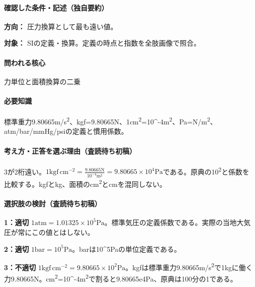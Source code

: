 \paragraph{確認した条件・記述（独自要約）}\mbox{}\par

\noindent\textbf{方向：} 圧力換算として最も遠い値。\par

\noindent\textbf{対象：} SIの定義・換算。定義の時点と指数を全肢画像で照合。\par

\paragraph{問われる核心} 力単位と面積換算の二乗

\paragraph{必要知識} 標準重力9.80665m/s\textsuperscript{2}、kgf=\allowbreak{}9.80665N、1cm\textsuperscript{2}=10\textasciicircum{}-4m\textsuperscript{2}、Pa=\allowbreak{}N/m\textsuperscript{2}、atm/bar/mmHg/psiの定義と慣用係数。

\paragraph{考え方・正答を選ぶ理由（査読待ち初稿）} 3が2桁遠い。\(1\mathrm{kgf\,cm^{-2}}=\frac{9.80665\mathrm N}{10^{-4}\mathrm{m^2}}=9.80665\times10^4\mathrm{Pa}\)である。原典の10\textsuperscript{2}と係数を比較する。kgfとkg、面積のcm\textsuperscript{2}とcmを混同しない。

\paragraph{選択肢の検討（査読待ち初稿）}\mbox{}\par

\noindent\textbf{1：適切} \(1\mathrm{atm}=1.01325\times10^5\mathrm{Pa}\)。標準気圧の定義係数である。実際の当地大気圧が常にこの値とはしない。\par

\noindent\textbf{2：適切} \(1\mathrm{bar}=10^5\mathrm{Pa}\)。barは10\textasciicircum{}5Paの単位定義である。\par

\noindent\textbf{3：不適切} \(1\mathrm{kgf\,cm^{-2}}=9.80665\times10^2\mathrm{Pa}\)。kgfは標準重力9.80665m/s\textsuperscript{2}で1kgに働く力9.80665N。cm\textsuperscript{2}=10\textasciicircum{}-4m\textsuperscript{2}で割ると9.80665e4Pa、原典は100分の1である。\par

